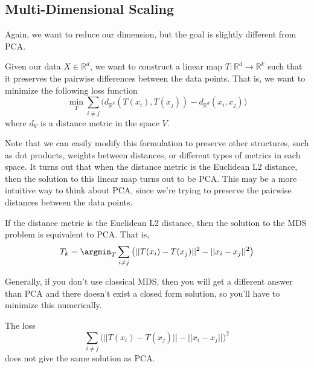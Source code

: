   \subsection{Multi-Dimensional Scaling}

    Again, we want to reduce our dimension, but the goal is slightly different from PCA. 

    \begin{definition}
      Given our data $X \in \mathbb{R}^d$, we want to construct a linear map $T: \mathbb{R}^d \rightarrow \mathbb{R}^k$ such that it preserves the pairwise differences between the data points. That is, we want to minimize the following loss function 
      \begin{equation}
        \min_{T} \sum_{i \neq j} \big( d_{\mathbb{R}^k}(T(x_i), T(x_j)) - d_{\mathbb{R}^d}(x_i, x_j) \big)
      \end{equation}
      where $d_{V}$ is a distance metric in the space $V$. 
    \end{definition}

    Note that we can easily modify this formulation to preserve other structures, such as dot products, weights between distances, or different types of metrics in each space. It turns out that when the distance metric is the Euclidean L2 distance, then the solution to this linear map turns out to be PCA. This may be a more intuitive way to think about PCA, since we're trying to preserve the pairwise distances between the data points. 

    \begin{theorem}
      If the distance metric is the Euclidean L2 distance, then the solution to the MDS problem is equivalent to PCA. That is, 
      \begin{equation}
        T_k = \argmin_{T} \sum_{i \neq j} \big( ||T(x_i) - T(x_j)||^2 - ||x_i - x_j||^2 \big)
      \end{equation}
    \end{theorem}

    Generally, if you don't use classical MDS, then you will get a different answer than PCA and there doesn't exist a closed form solution, so you'll have to minimize this numerically. 

    \begin{example}
      The loss 
      \begin{equation}
        \sum_{i \neq j}  \big( ||T(x_i) - T(x_j)|| - ||x_i - x_j|| \big)^2 
      \end{equation}
      does not give the same solution as PCA. 
    \end{example}

